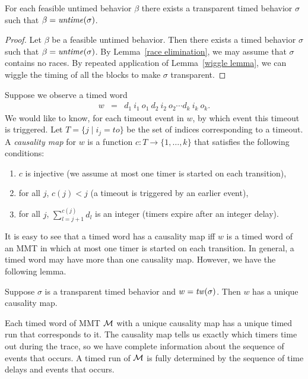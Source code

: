 \begin{lemma}
\label{lemma: transparent timed behavior}
For each feasible untimed behavior $\beta$ there exists
a transparent timed behavior $\sigma$ such that $\beta = \mathit{untime}(\sigma)$.
\end{lemma}
\begin{proof}
Let $\beta$ be a feasible untimed behavior.
Then there exists a timed behavior $\sigma$ such that $\beta = \mathit{untime}(\sigma)$.
By Lemma~\ref{race elimination}, we may assume that $\sigma$ contains no races.
By repeated application of Lemma~\ref{wiggle lemma}, we can wiggle the timing of all the blocks to make $\sigma$ transparent.
\end{proof}

Suppose we observe a timed word
\begin{eqnarray*}
w & = &  d_1 ~ i_1 ~ o_1 ~ d_2 ~ i_2 ~ o_2 \cdots d_k ~ i_k ~ o_k.
\end{eqnarray*}
We would like to know, for each timeout event in $w$, by which event this timeout is triggered.
Let $T = \{ j \mid i_j = \mathit{to} \}$ be the set of indices corresponding to a timeout.
A \emph{causality map} for $w$ is a function $c: T \rightarrow \{ 1 ,\ldots, k \}$ that satisfies the following conditions:
\begin{enumerate}
\item
$c$ is injective (we assume at most one timer is started on each transition),
\item
for all $j$, $c(j) < j$ (a timeout is triggered by an earlier event),
\item
for all $j$, $\sum_{l=j+1}^{c(j)} d_l$ is an integer (timers expire after an integer delay).
\end{enumerate}
It is easy to see that a timed word has a causality map iff $w$ is a timed word of an MMT in which at most one timer
is started on each transition. In general, a timed word may have more than one causality map. However, we have the following
lemma.

\begin{lemma}
\label{lemma unique causality map}
Suppose $\sigma$ is a transparent timed behavior and $w = \mathit{tw}(\sigma)$.
Then $w$ has a unique causality map.
\end{lemma}

Each timed word of MMT ${\cal M}$ with a unique causality map has a unique timed run that corresponds to it.
The causality map tells us exactly which timers time out during the trace, so we have complete information
about the sequence of events that occurs. A timed run of ${\cal M}$ is fully determined
by the sequence of time delays and events that occurs.

